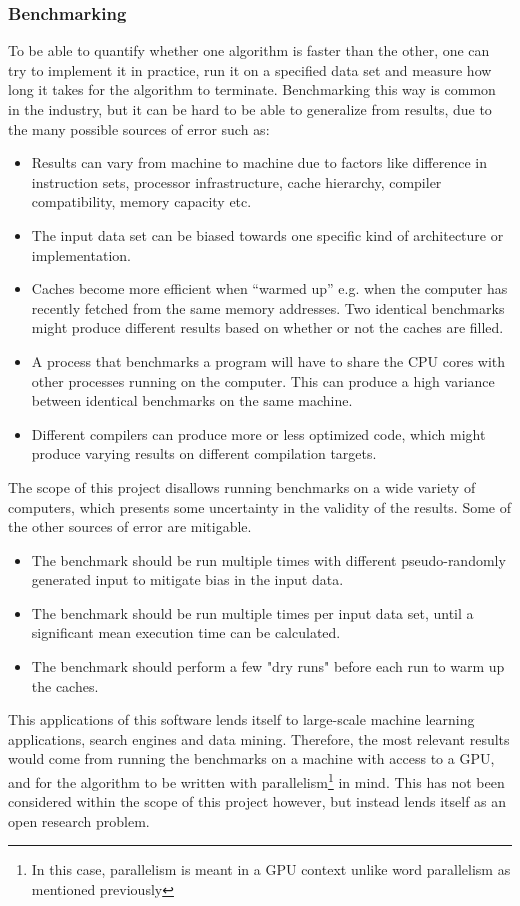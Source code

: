 \subsubsection{Benchmarking}
To be able to quantify whether one algorithm is faster than the other, one can try to implement it in practice, run it on a specified data set and measure how long it takes for the algorithm to terminate. Benchmarking this way is common in the industry, but it can be hard to be able to generalize from results, due to the many possible sources of error such as:
\begin{itemize}
    \item Results can vary from machine to machine due to factors like difference in instruction sets, processor infrastructure, cache hierarchy, compiler compatibility, memory capacity etc.
    \item The input data set can be biased towards one specific kind of architecture or implementation.
    \item Caches become more efficient when ``warmed up'' e.g. when the computer has recently fetched from the same memory addresses. Two identical benchmarks might produce different results based on whether or not the caches are filled.
    \item A process that benchmarks a program will have to share the CPU cores with other processes running on the computer. This can produce a high variance between identical benchmarks on the same machine.
    \item Different compilers can produce more or less optimized code, which might produce varying results on different compilation targets.
\end{itemize}
The scope of this project disallows running benchmarks on a wide variety of computers, which presents some uncertainty in the validity of the results. Some of the other sources of error are mitigable.
\begin{itemize}
    \item The benchmark should be run multiple times with different pseudo-randomly generated input to mitigate bias in the input data.
    \item The benchmark should be run multiple times per input data set, until a significant mean execution time can be calculated.
    \item The benchmark should perform a few "dry runs" before each run to warm up the caches.
\end{itemize}
This applications of this software lends itself to large-scale machine learning applications, search engines and data mining. Therefore, the most relevant results would come from running the benchmarks on a machine with access to a GPU, and for the algorithm to be written with parallelism\footnote{In this case, parallelism is meant in a GPU context unlike word parallelism as mentioned previously} in mind. This has not been considered within the scope of this project however, but instead lends itself as an open research problem.
